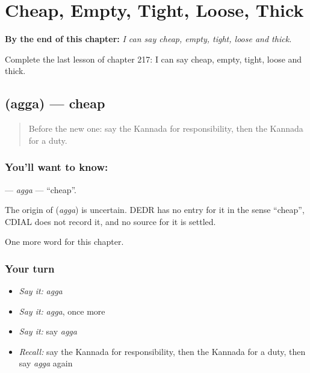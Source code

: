 
\chapter{Cheap, Empty, Tight, Loose, Thick}
\label{ch:ka-cheap-empty-tight-loose-thick}

\begin{chapteropening}
\textbf{By the end of this chapter:} \emph{I can say cheap, empty, tight, loose and thick.}

Complete the last lesson of chapter 217: I can say cheap, empty, tight, loose and thick.
\end{chapteropening}

\section[\texorpdfstring{\kn{ಅಗ್ಗ} (agga)}{ಅಗ್ಗ (agga)}]{ (agga) — cheap}

\label{lesson:KA-C217-agga}



\begin{quote}
Before the new one: say the Kannada for responsibility, then the Kannada for a duty.
\end{quote}

\subsection*{You'll want to know: }
\textbf{} — \emph{agga} — \textquotedblleft{}cheap\textquotedblright{}.

\begin{cousinweb}
The origin of \textbf{} (\emph{agga}) is uncertain. DEDR has no entry for it in the sense \textquotedblleft{}cheap\textquotedblright{}, CDIAL does not record it, and no source for it is settled.
\end{cousinweb}

\begin{grammarlens}[title={What you've built}]
One more word for this chapter.
\end{grammarlens}

\subsection*{Your turn}
\begin{itemize}
\raggedright
  \item \emph{Say it:} \emph{agga}
  \item \emph{Say it:} \emph{agga}, once more
  \item \emph{Say it:} say \emph{agga}
  \item \emph{Recall:} say the Kannada for responsibility, then the Kannada for a duty, then say \emph{agga} again
\end{itemize}

